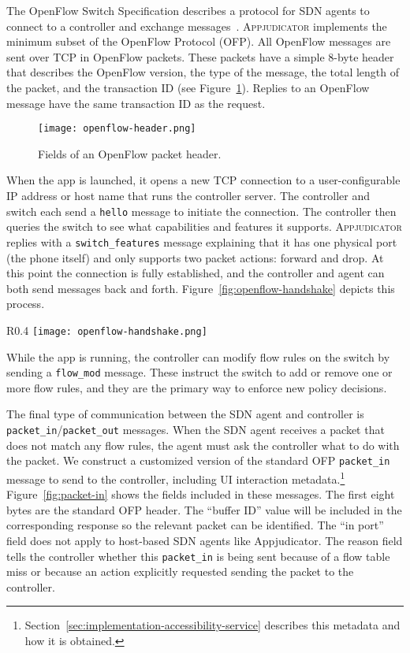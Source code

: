 The OpenFlow Switch Specification describes a protocol for SDN agents to connect
to a controller and exchange messages~\cite{openflowspec}. \textsc{Appjudicator}
implements the minimum subset of the OpenFlow Protocol (OFP). All OpenFlow
messages are sent over TCP in OpenFlow packets. These packets have a simple
8-byte header that describes the OpenFlow version, the type of the message, the
total length of the packet, and the transaction ID (see
Figure~\ref{fig:openflow-header}). Replies to an OpenFlow message have the same
transaction ID as the request.

\begin{figure}[h]
    \centering
    \texttt{[image: openflow-header.png]}
    \caption{Fields of an OpenFlow packet header.}
    \label{fig:openflow-header}
\end{figure}

When the app is launched, it opens a new TCP connection to a user-configurable
IP address or host name that runs the controller server. The controller and
switch each send a \texttt{hello} message to initiate the connection. The
controller then queries the switch to see what capabilities and features it
supports.  \textsc{Appjudicator} replies with a \texttt{switch\_features}
message explaining that it has one physical port (the phone itself) and only
supports two packet actions: forward and drop. At this point the connection is
fully established, and the controller and agent can both send messages back and
forth.  Figure~\ref{fig:openflow-handshake} depicts this process.

\begin{wrapfigure}{R}{0.4\textwidth}
	\centering
	\texttt{[image: openflow-handshake.png]}
    \caption{OpenFlow handshake diagram.}
    \label{fig:openflow-handshake}
\end{wrapfigure}

While the app is running, the controller can modify flow rules on the
switch by sending a \texttt{flow\_mod} message. These instruct the switch
to add or remove one or more flow rules, and they are the primary way to enforce
new policy decisions.

The final type of communication between the SDN agent and controller is
\texttt{packet\_in}/\texttt{packet\_out} messages. When the SDN agent receives a
packet that does not match any flow rules, the agent must ask the controller
what to do with the packet. We construct a customized version of the standard
OFP \texttt{packet\_in} message to send to the controller, including UI
interaction metadata.\footnote{
	Section~\ref{sec:implementation-accessibility-service} describes this
	metadata and how it is obtained.} Figure~\ref{fig:packet-in} shows the
fields included in these messages. The first eight bytes are the standard OFP
header. The ``buffer ID'' value will be included in the corresponding response
so the relevant packet can be identified.  The ``in port'' field does not apply
to host-based SDN agents like Appjudicator.  The reason field tells the
controller whether this \texttt{packet\_in} is being sent because of a flow
table miss or because an action explicitly requested sending the packet to the
controller.

